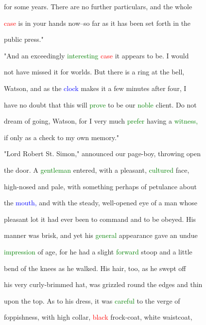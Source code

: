  for some years. There are no further particulars, and the whole

 \textcolor{red}{case} is in your hands now--so far as it has been set forth in the

 \textcolor{BurntOrange}{public} press."



 "And an exceedingly \textcolor{green}{interesting} \textcolor{red}{case} it appears to be. I would

 not have missed it for worlds. But there is a ring at the bell,

 Watson, and as the \textcolor{blue}{clock} makes it a few minutes after four, I

 have no \textcolor{BurntOrange}{doubt} that this will \textcolor{green}{prove} to be our \textcolor{green}{noble} client. Do not

 dream of going, Watson, for I very much \textcolor{green}{prefer} having a \textcolor{green}{witness,}

 if only as a check to my own memory."



 \textcolor{BurntOrange}{"Lord} Robert St. Simon," announced our page-boy, throwing open

 the door. A \textcolor{green}{gentleman} entered, with a \textcolor{BurntOrange}{pleasant,} \textcolor{green}{cultured} face,

 high-nosed and pale, with something perhaps of petulance about

 the \textcolor{blue}{mouth,} and with the \textcolor{BurntOrange}{steady,} well-opened eye of a man whose

 \textcolor{BurntOrange}{pleasant} lot it had ever been to command and to be obeyed. His

 manner was brisk, and yet his \textcolor{green}{general} appearance gave an undue

 \textcolor{green}{impression} of age, for he had a slight \textcolor{green}{forward} stoop and a little

 bend of the knees as he walked. His hair, too, as he swept off

 his very curly-brimmed hat, was grizzled round the edges and thin

 upon the \textcolor{BurntOrange}{top.} As to his dress, it was \textcolor{green}{careful} to the \textcolor{BurntOrange}{verge} of

 foppishness, with high collar, \textcolor{red}{black} frock-coat, \textcolor{BurntOrange}{white} waistcoat,

